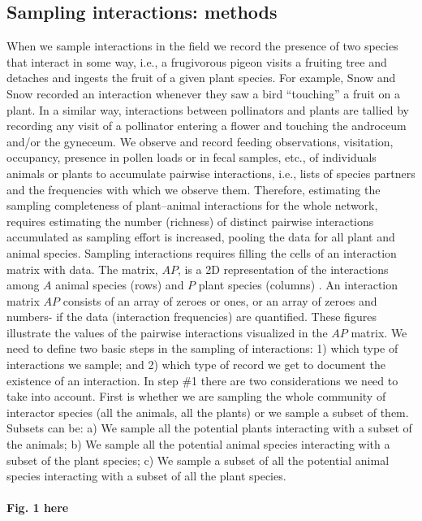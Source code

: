 \documentclass[a4paper,12pt]{article}
\begin{document}
\begin{spacing}{1.0}
\chapter{Sampling interactions: methods}
\label{samplinginteractions:methods}

When we sample interactions in the field we record the presence of two species that interact in some way, i.e., a frugivorous pigeon visits a fruiting tree and detaches and ingests the fruit of a given plant species. For example, Snow and Snow\citep{Snow:1988iu} recorded an interaction whenever they saw a bird ``touching'' a fruit on a plant. In a similar way, interactions between pollinators and plants are tallied by recording any visit of a pollinator entering a flower and touching the androceum and\slash or the gyneceum. We observe and record feeding observations, visitation, occupancy, presence in pollen loads or in fecal samples, etc., of individuals animals or plants to accumulate pairwise interactions, i.e., lists of species partners and the frequencies with which we observe them. Therefore, estimating the sampling completeness of plant–animal interactions for the whole network, requires estimating the number (richness) of distinct pairwise interactions accumulated as sampling effort is increased, pooling the data for all plant and animal species.
 Sampling interactions requires filling the cells of an interaction matrix with data. The matrix, $AP$, is a 2D representation of the interactions among $A$ animal species (rows) and $P$ plant species (columns) \citep{E31/2562}\citep{Bascompte:2014to}. An interaction matrix $AP$ consists of an array of zeroes or ones, or an array of zeroes and numbers- if the data (interaction frequencies) are quantified. These figures illustrate the values of the pairwise interactions visualized in the $AP$ matrix.
 We need to define two basic steps in the sampling of interactions: 1) which type of interactions we sample; and 2) which type of record we get to document the existence of an interaction. In step \#1 there are two considerations we need to take into account. First is whether we are sampling the whole community of interactor species (all the animals, all the plants) or we sample a subset of them. Subsets can be: a) We sample all the potential plants interacting with a subset of the animals; b) We sample all the potential animal species interacting with a subset of the plant species; c) We sample a subset of all the potential animal species interacting with a subset of all the plant species.

\subsubsection{Fig. 1 here}
\label{fig.1here}


\end{spacing}
\end{document}
